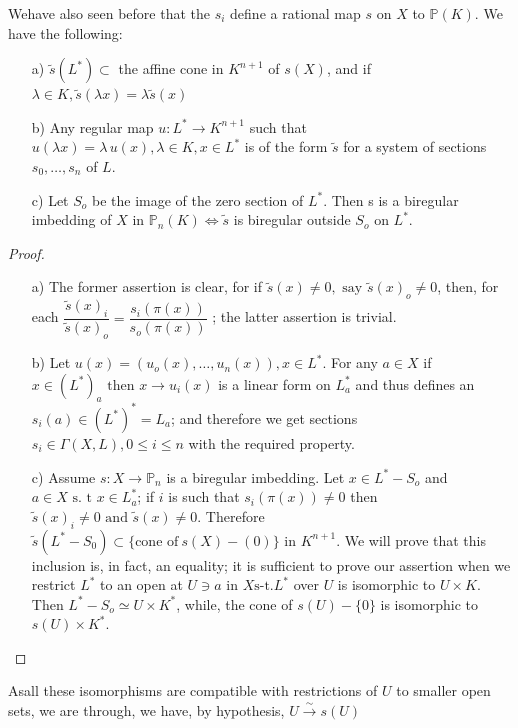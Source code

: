 {We\pageoriginale have also seen before that  the $s_i$ define a rational map $s$ on
$X$ to $\mathbb{P}(K)$. We have the following: 
\begin{enumerate}
\item[a)] $\tilde{s} (L^*)\subset$ the affine cone in $K^{n+1}$ of
  $s(X)$, and if $\lambda \in K,\tilde{s}(\lambda x)= \lambda \tilde{s}
  (x)$ 
\item[b)] Any regular map $u: L^* \to K^{n+1}$ such that $u(\lambda
  x)=\lambda \, u(x), \lambda \in K, x \in L^*$ is of the form
  $\tilde{s}$ for a system of sections $s_0,\ldots,s_n$ of $L$. 
\item[c)] Let $S_o$ be the image of the zero section of $L^*$. Then s
  is a biregular imbedding of $X$ in $\mathbb{P}_n(K) \Leftrightarrow
  \tilde{s}$ is biregular outside $S_o \text{ on }L^*$. 
\end{enumerate}

\begin{proof}%
  \begin{enumerate}
  \item[a)] The former assertion is clear, for if $\tilde{s}(x)\neq 0,
    \text{ say }\tilde{s}(x)_o\neq 0$, then, for each
    $\dfrac{\tilde{s}(x)_i}{\tilde{s}(x)_o}=\dfrac{s_i(\pi(x))}
         {s_o(\pi(x))}$ ; the latter assertion is trivial. 
  \item[b)] Let $ u(x)=(u_o(x),\ldots ,u_n(x)), x \in L^*$. For any $a
    \in X$  if  $x \in (L^*)_a \text{ then }x \to u_i(x)$ is a linear
    form on $L^*_a$ and thus defines an $s_i(a) \in (L^*)^*=L_a$; and
    therefore we get sections $s_i\in \Gamma(X,L), 0 \leq i \leq n$ with the
    required property. 
  \item[c)] Assume $s:X \to \mathbb{P}_n$ is a biregular
    imbedding. Let $x \in L^*-S_o$ and  $a\in X \text{ s. t } x \in
    L^*_a$; if $i$ is such that $s_i(\pi (x))\neq 0 $ then
    $\tilde{s}(x)_i \neq 0 \text{ and } \tilde{s}(x) \neq
    0$. Therefore $\tilde{s}(L^*-S_0) \subset \{\text{cone of}~ s(X)-(0)\}$
    in $K^{n+1}$. We will prove that this inclusion is, in
    fact, an equality; it is sufficient to prove our assertion when we
    restrict $L^*$ to an open at $U \ni a \text{ in }X \text{
      s-t}. L^*$ over $U$ is isomorphic to $U \times K$. Then $L^* -S_o
    \simeq U \times K^*$, while, the cone of $s(U)-\{0\}$ is
    isomorphic to $s(U) \times K^*$. 
\end{enumerate}
\end{proof}

As\pageoriginale all these isomorphisms are compatible with restrictions of $U$ to
smaller open sets, we are through, we have, by hypothesis, $U
\xrightarrow{\sim}  s(U)$ 

}
